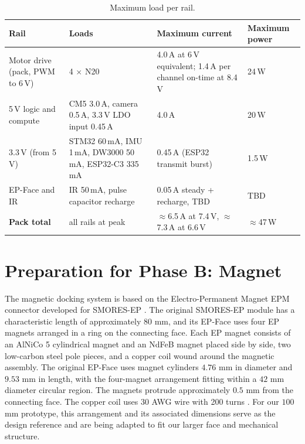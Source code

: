 \documentclass[12pt,a4paper]{article}
\begin{document}
\begin{table}[H]
\centering\small
\caption{Maximum load per rail.}
\label{tab:rail-max}
\begin{tabular}{@{}L{0.22\textwidth} L{0.30\textwidth} L{0.26\textwidth}
                    L{0.14\textwidth}@{}}
\toprule
\textbf{Rail} & \textbf{Loads} & \textbf{Maximum current} &
\textbf{Maximum power} \\
\midrule
Motor drive (pack, PWM to 6\,V) & 4 $\times$ N20 &
  4.0\,A at 6\,V equivalent; 1.4\,A per channel on-time at 8.4\,V & 24\,W \\
5\,V logic and compute &
  CM5 3.0\,A, camera 0.5\,A, 3.3\,V LDO input 0.45\,A & 4.0\,A & 20\,W \\
3.3\,V (from 5\,V) &
  STM32 60\,mA, IMU 1\,mA, DW3000 50\,mA, ESP32-C3 335\,mA &
  0.45\,A (ESP32 transmit burst) & 1.5\,W \\
EP-Face and IR & IR 50\,mA, pulse capacitor recharge &
  0.05\,A steady + recharge, TBD & TBD \\
\midrule
\textbf{Pack total} & all rails at peak &
  $\approx$6.5\,A at 7.4\,V, $\approx$7.3\,A at 6.6\,V & $\approx$47\,W \\
\bottomrule
\end{tabular}
\end{table}

\section{Preparation for Phase B: Magnet}
\label{sec:phase-b-magnet}

The magnetic docking system is based on the Electro-Permanent Magnet EPM connector developed for SMORES-EP \cite{ep_face}. The original SMORES-EP module has a characteristic length of approximately \(80\) mm, and its EP-Face uses four EP magnets arranged in a ring on the connecting face. Each EP magnet consists of an AlNiCo 5 cylindrical magnet and an NdFeB magnet placed side by side, two low-carbon steel pole pieces, and a copper coil wound around the magnetic assembly. The original EP-Face uses magnet cylinders \(4.76\) mm in diameter and \(9.53\) mm in length, with the four-magnet arrangement fitting within a \(42\) mm diameter circular region. The magnets protrude approximately \(0.5\) mm from the connecting face. The copper coil uses 30 AWG wire with 200 turns \cite{ep_face}. For our \(100\) mm prototype, this arrangement and its associated dimensions serve as the design reference and are being adapted to fit our larger face and mechanical structure.
\end{document}
